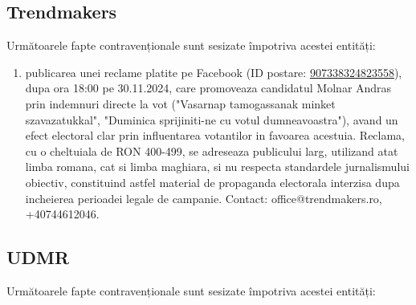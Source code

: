 \documentclass[a4paper,12pt]{article}
\begin{document}
\vspace{0.5cm}

\subsection{Trendmakers}
Următoarele fapte contravenționale sunt sesizate împotriva acestei entități:

\begin{enumerate}[leftmargin=*, label=\arabic*.)]
    \item publicarea unei reclame platite pe Facebook (ID postare: \href{https://www.facebook.com/ads/library/?id=907338324823558}{907338324823558}), dupa ora 18:00 pe 30.11.2024, care promoveaza candidatul Molnar Andras prin indemnuri directe la vot ("Vasarnap tamogassanak minket szavazatukkal", "Duminica sprijiniti-ne cu votul dumneavoastra"), avand un efect electoral clar prin influentarea votantilor in favoarea acestuia. Reclama, cu o cheltuiala de RON 400-499,  se adreseaza publicului larg, utilizand atat limba romana, cat si limba maghiara, si nu respecta standardele jurnalismului obiectiv, constituind astfel material de propaganda electorala interzisa dupa incheierea perioadei legale de campanie.  Contact: office@trendmakers.ro, +40744612046.
\end{enumerate}

\vspace{0.5cm}

\subsection{UDMR}
Următoarele fapte contravenționale sunt sesizate împotriva acestei entități:
\end{document}
